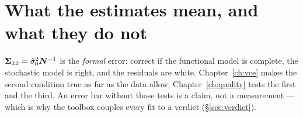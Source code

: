 \section{What the estimates mean, and what they do not}

$\bm{\Sigma}_{\hat x\hat x} = \hat\sigma_0^2\bm{N}^{-1}$ is the \emph{formal} error: correct if the functional model is complete, the stochastic model is right, and the residuals are white. Chapter~\ref{ch:vce} makes the second condition true as far as the data allow; Chapter~\ref{ch:quality} tests the first and the third. An error bar without those tests is a claim, not a measurement --- which is why the toolbox couples every fit to a verdict (\S\ref{sec:verdict}).
